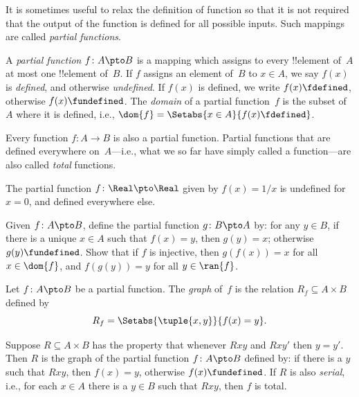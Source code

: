\documentclass[../../../include/open-logic-section]{subfiles}
\begin{document}


\begin{explain}
It is sometimes useful to relax the definition of function so that it
is not required that the output of the function is defined for all
possible inputs. Such mappings are called \emph{partial functions}.
\end{explain}

\begin{defn}
A \emph{partial function} $f \colon A \pto B$ is a mapping which
assigns to every !!{element} of~$A$ at most one !!{element} of~$B$.
If $f$ assigns an element of~$B$ to $x \in A$, we say $f(x)$ is
\emph{defined}, and otherwise \emph{undefined}. If $f(x)$ is defined,
we write $f(x) \fdefined$, otherwise $f(x) \fundefined$. The
\emph{domain} of a partial function~$f$ is the subset of~$A$ where it
is defined, i.e., $\dom{f} = \Setabs{x \in A}{f(x) \fdefined}$.
\end{defn}

\begin{ex}
Every function $f\colon A \to B$ is also a partial function. Partial
functions that are defined everywhere on~$A$---i.e., what we so far
have simply called a function---are also called \emph{total}
functions.
\end{ex}

\begin{ex}
The partial function $f \colon \Real \pto \Real$ given by $f(x) = 1/x$
is undefined for $x = 0$, and defined everywhere else.
\end{ex}

\begin{prob}
Given $f\colon A \pto B$, define the partial function $g\colon B \pto
A$ by: for any $y \in B$, if there is a unique $x \in A$ such that
$f(x) = y$, then $g(y) = x$; otherwise $g(y) \fundefined$.  Show that
if $f$ is injective, then $g(f(x)) = x$ for all $x \in \dom{f}$, and
$f(g(y)) = y$ for all $y \in \ran{f}$.
\end{prob}

\begin{defn}
Let $f\colon A \pto B$ be a partial function. The \emph{graph} of~$f$
is the relation $R_f \subseteq A \times B$ defined by
\[
R_f = \Setabs{\tuple{x,y}}{f(x) = y}.
\]
\end{defn}

\begin{prop}
Suppose $R \subseteq A \times B$ has the property that whenever $Rxy$
and $Rxy'$ then $y = y'$.  Then $R$ is the graph of the partial
function $f\colon A \pto B$ defined by: if there is a $y$ such that
$Rxy$, then $f(x) = y$, otherwise $f(x) \fundefined$.  If $R$ is also
\emph{serial}, i.e., for each $x \in A$ there is a $y \in B$ such that
$Rxy$, then $f$ is total.
\end{prop}
\end{document}
